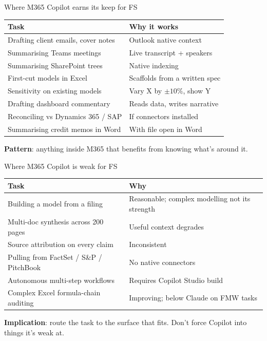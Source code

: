 \documentclass[11pt,aspectratio=169]{beamer}
\begin{document}
\begin{frame}{Where M365 Copilot earns its keep for FS}
  \centering\small
  \begin{tabular}{lp{}}
    \toprule
    \textbf{Task} & \textbf{Why it works} \\
    \midrule
    Drafting client emails, cover notes & Outlook native context \\
    Summarising Teams meetings & Live transcript + speakers \\
    Summarising SharePoint trees & Native indexing \\
    First-cut models in Excel & Scaffolds from a written spec \\
    Sensitivity on existing models & Vary X by $\pm10\%$, show Y \\
    Drafting dashboard commentary & Reads data, writes narrative \\
    Reconciling vs Dynamics 365 / SAP & If connectors installed \\
    Summarising credit memos in Word & With file open in Word \\
    \bottomrule
  \end{tabular}

  \vfill
  \raggedright \textbf{Pattern}: anything inside M365 that benefits from knowing what's around it.
\end{frame}

\begin{frame}{Where M365 Copilot is weak for FS}
  \centering\small
  \begin{tabular}{lp{}}
    \toprule
    \textbf{Task} & \textbf{Why} \\
    \midrule
    Building a model from a filing & Reasonable; complex modelling not its strength \\
    Multi-doc synthesis across 200 pages & Useful context degrades \\
    Source attribution on every claim & Inconsistent \\
    Pulling from FactSet / S\&P / PitchBook & No native connectors \\
    Autonomous multi-step workflows & Requires Copilot Studio build \\
    Complex Excel formula-chain auditing & Improving; below Claude on FMW tasks \\
    \bottomrule
  \end{tabular}

  \vfill
  \raggedright \textbf{Implication}: route the task to the surface that fits. Don't force Copilot into things it's weak at.
\end{frame}
\end{document}
